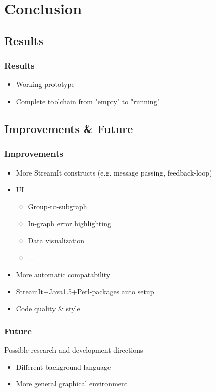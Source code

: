 \documentclass{beamer}
\begin{document}
\section{Conclusion}

\subsection{Results}
\begin{frame}
\frametitle{Results}
	\begin{itemize}
		\item Working prototype
		\item Complete toolchain from "empty" to "running"
	\end{itemize}
\end{frame}

\subsection{Improvements \& Future}
\begin{frame}
\frametitle{Improvements}
	\begin{itemize}
		\item More StreamIt constructs (e.g. message passing, feedback-loop)
		\item UI
		\begin{itemize}
			\item Group-to-subgraph
			\item In-graph error highlighting
			\item Data visualization
			\item ...
		\end{itemize}
		\item More automatic compatability
		\item StreamIt+Java1.5+Perl-packages auto setup
		\item Code quality \& style
	\end{itemize}
\end{frame}

\begin{frame}
\frametitle{Future}
Possible research and development directions
	\begin{itemize}
		\item Different background language
		\item More general graphical environment
	\end{itemize}
\end{frame}
\end{document}
